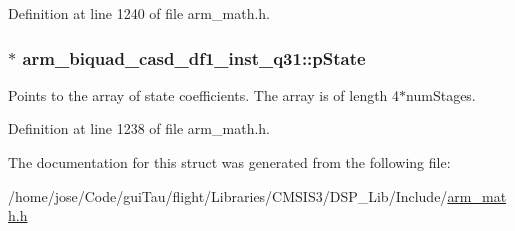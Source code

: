 Definition at line 1240 of file arm\-\_\-math.\-h.

\hypertarget{structarm__biquad__casd__df1__inst__q31_a5dcf4727f58eb4e8e8b392508d8657bb}{
\subsubsection[{p\-State}]{$\ast$ arm\-\_\-biquad\-\_\-casd\-\_\-df1\-\_\-inst\-\_\-q31\-::p\-State}}\label{structarm__biquad__casd__df1__inst__q31_a5dcf4727f58eb4e8e8b392508d8657bb}
Points to the array of state coefficients. The array is of length 4$\ast$num\-Stages. 

Definition at line 1238 of file arm\-\_\-math.\-h.



The documentation for this struct was generated from the following file\-:\begin{DoxyCompactItemize}
\item 
/home/jose/\-Code/gui\-Tau/flight/\-Libraries/\-C\-M\-S\-I\-S3/\-D\-S\-P\-\_\-\-Lib/\-Include/\hyperlink{arm__math_8h}{arm\-\_\-math.\-h}\end{DoxyCompactItemize}
